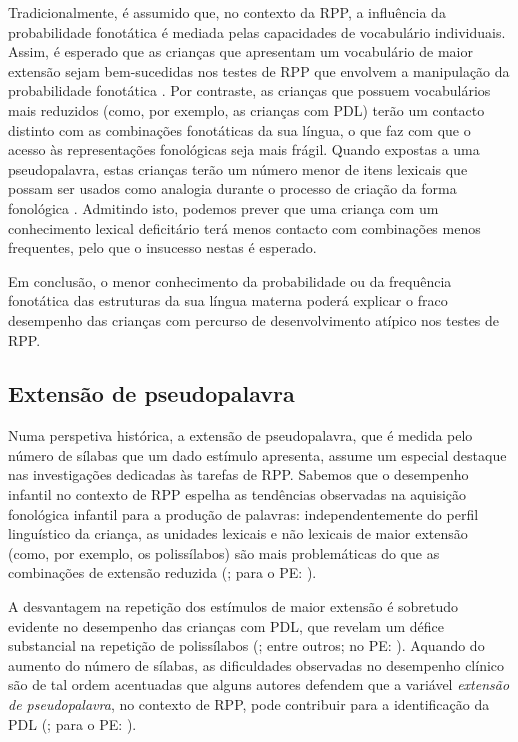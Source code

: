 \documentclass[output=paper,colorlinks,citecolor=brown,booklanguage=portuguese]{langscibook}
\begin{document}
Tradicionalmente, é assumido que, no contexto da RPP, a influência da probabilidade fonotática é mediada pelas capacidades de vocabulário individuais. Assim, é esperado que as crianças que apresentam um vocabulário de maior extensão sejam bem-sucedidas nos testes de RPP que envolvem a manipulação da probabilidade fonotática \citep{Munson2005}. Por contraste, as crianças que possuem vocabulários mais reduzidos (como, por exemplo, as crianças com PDL) terão um contacto distinto com as combinações fonotáticas da sua língua, o que faz com que o acesso às representações fonológicas seja mais frágil. Quando expostas a uma pseudopalavra, estas crianças terão um número menor de itens lexicais que possam ser usados como analogia durante o processo de criação da forma fonológica \citep[433]{Edwards2004}. Admitindo isto, podemos prever que uma criança com um conhecimento lexical deficitário terá menos contacto com combinações menos frequentes, pelo que o insucesso nestas é esperado. 

Em conclusão, o menor conhecimento da probabilidade ou da frequência fonotática das estruturas da sua língua materna poderá explicar o fraco desempenho das crianças com percurso de desenvolvimento atípico nos testes de RPP.

\subsection{Extensão de pseudopalavra}
Numa perspetiva histórica, a extensão de pseudopalavra, que é medida pelo número de sílabas que um dado estímulo apresenta, assume um especial destaque nas investigações dedicadas às tarefas de RPP. Sabemos que o desempenho infantil no contexto de RPP espelha as tendências observadas na aquisição fonológica infantil para a produção de palavras: independentemente do perfil linguístico da criança, as unidades lexicais e não lexicais de maior extensão (como, por exemplo, os polissílabos) são mais problemáticas do que as combinações de extensão reduzida (\citealp{Bishop1996, Gathercole1990, Gathercole1994, Montgomery1995}; para o PE: \citealp{CruzSantos2009, Ribeiro2011}).

A desvantagem na repetição dos estímulos de maior extensão é sobretudo evidente no desempenho das crianças com PDL, que revelam um défice substancial na repetição de polissílabos (\citealp{Gathercole1990, Gathercole1994, Montgomery1995}; entre outros; no PE: \citealp{CruzSantos2009}). Aquando do aumento do número de sílabas, as dificuldades observadas no desempenho clínico são de tal ordem acentuadas que alguns autores defendem que a variável \emph{extensão de pseudopalavra}, no contexto de RPP, pode contribuir para a identificação da PDL (\citealp{Gathercole2006}; para o PE: \citealp{CruzSantos2009}).
\end{document}
